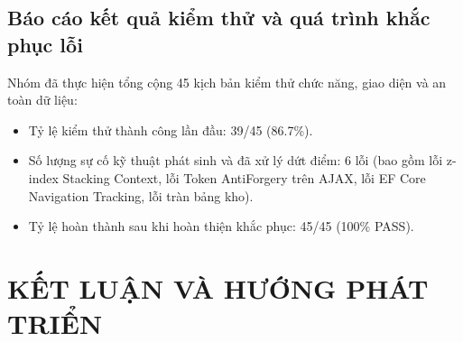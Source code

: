 \documentclass[12pt,a4paper]{report}
\renewcommand{\_}{\textunderscore\allowbreak}
\begin{document}
\section{Báo cáo kết quả kiểm thử và quá trình khắc phục lỗi}
Nhóm đã thực hiện tổng cộng 45 kịch bản kiểm thử chức năng, giao diện và an toàn dữ liệu:
\begin{itemize}
    \item Tỷ lệ kiểm thử thành công lần đầu: 39/45 (86.7\%).
    \item Số lượng sự cố kỹ thuật phát sinh và đã xử lý dứt điểm: 6 lỗi (bao gồm lỗi z-index Stacking Context, lỗi Token AntiForgery trên AJAX, lỗi EF Core Navigation Tracking, lỗi tràn bảng kho).
    \item Tỷ lệ hoàn thành sau khi hoàn thiện khắc phục: 45/45 (100\% PASS).
\end{itemize}

\cleardoublepage

\chapter{KẾT LUẬN VÀ HƯỚNG PHÁT TRIỂN}
\end{document}
